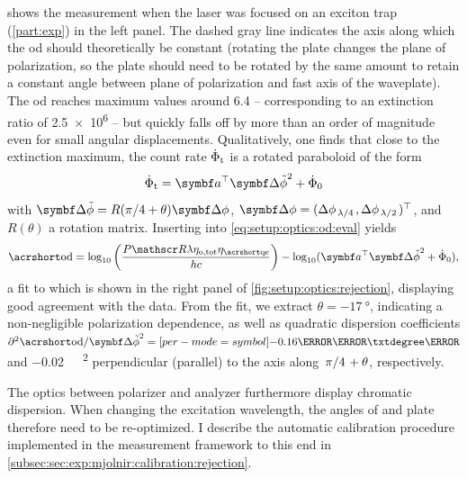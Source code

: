  shows the measurement when the laser was focused on an exciton trap (\cf \cref{part:exp}) in the left panel.
The dashed gray line indicates the axis along which the \gls{od} should theoretically be constant (rotating the \halfwave plate changes the plane of polarization, so the \quarterwave plate should need to be rotated by the same amount to retain a constant angle between plane of polarization and fast axis of the waveplate).
The \gls{od} reaches maximum values around \num{6.4} -- corresponding to an extinction ratio of \num{2.5e6} -- but quickly falls off by more than an order of magnitude even for small angular displacements.
Qualitatively, one finds that close to the extinction maximum, the count rate $\dot{\Phi}_{\mathrm{t}}$ is a rotated paraboloid of the form
\begin{equation}
    \dot{\Phi}_{\mr{t}} = \bvec{a}\transpose\bvec{\Delta\tilde{\phi}}^2 + \dot{\Phi}_0
\end{equation}
with $\bvec{\Delta\tilde{\phi}} = R(\pi/4+\theta)\bvec{\Delta\phi}$, $\bvec{\Delta\phi} = (\Delta\phi_{\quarterwave},\Delta\phi_{\halfwave})\transpose$, and $R(\theta)$ a rotation matrix.
Inserting into \cref{eq:setup:optics:od:eval} yields
\begin{equation}\label{eq:setup:optics:od:fit}
    \OD = \log_{10}\left(\frac{P \reflectance\lambda\eta_{\mr{o,tot}}\eta_{\QE}}{h c}\right) - \log_{10}(\bvec{a}\transpose\bvec{\Delta\tilde{\phi}}^2 + \dot{\Phi}_0),
\end{equation}
a fit to which is shown in the right panel of \cref{fig:setup:optics:rejection}, displaying good agreement with the data.
From the fit, we extract $\theta=\qty{-17}{\degree}$, indicating a non-negligible polarization dependence, as well as quadratic dispersion coefficients $\partial^2\OD/\bvec{\Delta\tilde{\phi}}^2=\qty[per-mode=symbol]{-0.16}{\per\milli\txtdegree\squared}$ and \qty[per-mode=symbol]{-0.02}{\per\milli\txtdegree\squared} perpendicular (parallel) to the axis along $\flatfrac{\pi}{4}+\theta$, respectively.

The optics between polarizer and analyzer furthermore display chromatic dispersion.
When changing the excitation wavelength, the angles of \halfwave and \quarterwave plate therefore need to be re-optimized.
I describe the automatic calibration procedure implemented in the measurement framework to this end in \cref{subsec:sec:exp:mjolnir:calibration:rejection}.

